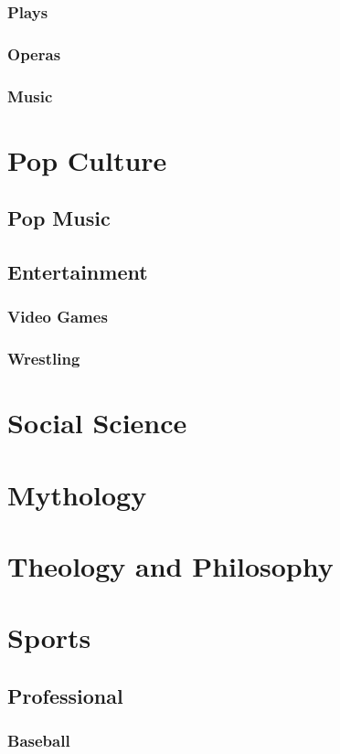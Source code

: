 \documentclass[12pt]{book}
\begin{document}
		\subsection{Plays}
		\subsection{Operas}
		\subsection{Music}
		
	
\chapter{Pop Culture}
	\section{Pop Music}
	\section{Entertainment}
		\subsection{Video Games}
		\subsection{Wrestling}
\chapter{Social Science}
\chapter{Mythology}
\chapter{Theology and Philosophy}
\chapter{Sports}
	\section{Professional}
		\subsection{Baseball}
\end{document}
